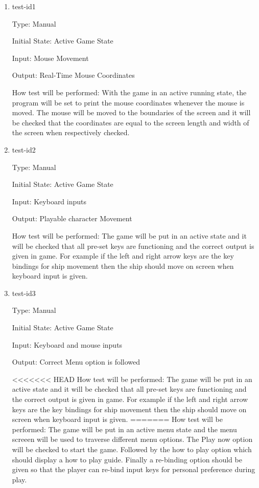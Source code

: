 \documentclass[12pt, titlepage]{article}
\begin{document}
\begin{enumerate}

\item{test-id1\\}

Type: Manual 
					
Initial State: Active Game State 
					
Input: Mouse Movement 
					
Output: Real-Time Mouse Coordinates 
					
How test will be performed: With the game in an active running state, the
program will be set to print the mouse coordinates whenever the mouse is moved.
The mouse will be moved to the boundaries of the screen and it will be checked
that the coordinates are equal to the screen length and width of the screen when
respectively checked.
					
\item{test-id2\\}

Type: Manual 
					
Initial State: Active Game State 
					
Input: Keyboard inputs
					
Output: Playable character Movement
					
How test will be performed: The game will be put in an active state and it will
be checked that all pre-set keys are functioning and the correct output is given
in game. For example if the left and right arrow keys are the key bindings for
ship movement then the ship should move on screen when keyboard input is given.


\item{test-id3\\}

Type: Manual
					
Initial State: Active Game State
					
Input: Keyboard and mouse inputs 
					
Output: Correct Menu option is followed 
					
<<<<<<< HEAD
How test will be performed: The game will be put in an active state and it will
be checked that all pre-set keys are functioning and the correct output is given
in game. For example if the left and right arrow keys are the key bindings for
ship movement then the ship should move on screen when keyboard input is given.
=======
How test will be performed: The game will be put in an active menu state and the menu screeen will be used to traverse different menu options. The Play now option will be checked to start the game. Followed by the how to play option which should display a how to play guide. Finally a re-binding option should be given so that the player can re-bind input keys for personal preference during play. 



\end{enumerate}
\end{document}
